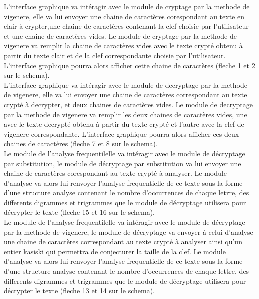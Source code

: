 \documentclass[a4]{article}
\begin{document}
	L'interface graphique va intéragir avec le module de cryptage par la methode de vigenere, elle va lui envoyer une
	 chaine de caractères corespondant au texte en clair à crypter,une chaine de caractères contenant la clef choisie par 
	 l'utilisateur et une chaine de caractères vides. Le module de cryptage par la methode de vigenere va remplir la chaine
	  de caractères vides avec le texte crypté obtenu à partir du texte clair et de la clef correspondante choisie par
	   l'utilisateur. L'interface graphique pourra alors afficher cette chaine de caractères (fleche 1 et 2 sur le schema). \\

	L'interface graphique va intéragir avec le module de decryptage par la methode de vigenere, elle va lui envoyer une 
	chaine de caractères correspondant au texte crypté à decrypter, et deux chaines de caractères vides. Le module de 
	decryptage par la methode de vigenere va remplir les deux chaines de caractères vides, une avec le texte decrypté 
	obtenu à partir du texte crypté et l'autre avec la clef de vigenere correspondante. L'interface graphique pourra 
	alors afficher ces deux chaines de caractères (fleche 7 et 8 sur le schema). \\

	Le module de l'analyse frequentilelle va intéragir avec le module de décryptage par substitution,
	 le module de décryptage par substitution va lui envoyer une chaine de caractères corespondant au texte 
	 crypté à analyser. Le module d'analyse va alors lui renvoyer l'analyse frequentielle de ce texte sous 
	 la forme d'une structure analyse contenant le nombre d'occurrences de chaque letrre, des differents digrammes 
	 et trigrammes que le module de décryptage utilisera pour décrypter le texte (fleche 15 et 16 sur le schema). \\

	Le module de l'analyse frequentilelle va intéragir avec le module de décryptage par la methode de vigenere, 
	le module de décryptage va envoyer à celui d'analyse une chaine de caractères correspondant au texte crypté à
	 analyser ainsi qu'un entier kasiski qui permettra de conjecturer la taille de la clef. Le module d'analyse va 
	 alors lui renvoyer l'analyse frequentielle de ce texte sous la forme d'une structure analyse contenant le nombre
	  d'occurrences de chaque lettre, des differents digrammes et trigrammes que le module de décryptage utilisera pour 
	  décrypter le texte (fleche 13 et 14 sur le schema). \\
\end{document}
